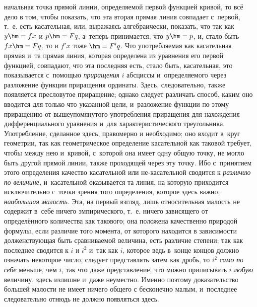 начальная точка прямой линии, определяемой первой функцией кривой, то всё дело
в том, чтобы показать, что эта вторая прямая линия совпадает с~первой, т.~е.
есть касательная, или, выражаясь алгебраически, показать, что так как $y\hm=fx$
и $p\hm=Fq$, а~теперь принимается, что $y\hm=p$, и, стало быть $fx\hm=Fq$, то и
$f'x$ тоже $\hm=F'q$. Что употребляемая как касательная прямая и~та прямая
линия, которая определена из уравнения его первой функцией, совпадают, что эта
последняя есть, стало быть, касательная, это показывается с~помощью
{\em приращения} $i$ абсциссы и~определяемого через разложение функции
приращения ординаты. Здесь, следовательно, также появляется пресловутое
приращение; однако следует различать способ, каким оно вводится для только что
указанной цели, и~разложение функции по этому приращению от вышеупомянутого
употребления приращения для нахождения дифференциального уравнения и~для
характеристического треугольника. Употребление, сделанное здесь, правомерно и
необходимо; оно входит в~круг геометрии, так как геометрическое определение
касательной как таковой требует, чтобы между нею и~кривой, с~которой она имеет
одну общую точку, не могло быть другой прямой линии, также проходящей через эту
точку. Ибо с~принятием этого определения качество касательной или
не-касательной сводится к {\em различию по величине,} и~касательной оказывается
та линия, на которую приходится исключительно с~точки зрения того определения,
которое здесь важно, {\em наибольшая малость}. Эта, на первый взгляд, лишь
относительная малость не содержит в~себе ничего эмпирического, т.~е. ничего
зависящего от определённого количества как такового; она положена качественно
природой формулы, если различие того момента, от которого находится в
зависимости долженствующая быть сравниваемой величина, есть различие степени;
так как последнее сводится к $i$ и $i^{2}$ и~так как $i$, которое ведь в~конце
концов должно означать некоторое число, следует представлять затем как дробь,
то $i^2$ {\em само по себе} меньше, чем $i$, так что даже представление, что
можно приписывать $i$ {\em любую} величину, здесь излишне и~даже неуместно.
Именно поэтому доказательство большей малости не имеет ничего общего с
бесконечно малым, и~последнее следовательно отнюдь не должно появляться здесь.

